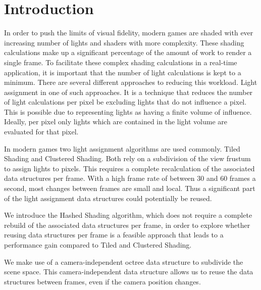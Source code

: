 \section{Introduction}

In order to push the limits of visual fidelity, modern games are shaded with
ever increasing number of lights and shaders with more complexity. These shading
calculations make up a significant percentage of the amount of work to render a
single frame. To facilitate these complex shading calculations in a real-time
application, it is important that the number of light calculations is kept to
a minimum. There are several different approaches to reducing this workload.
Light assignment in one of such approaches. It is a technique that reduces the
number of light calculations per pixel be excluding lights that do not influence
a pixel. This is possible due to representing lights as having a finite volume
of influence. Ideally, per pixel only lights which are contained in the light
volume are evaluated for that pixel.

In modern games two light assignment algorithms are used commonly. Tiled
Shading\cite{} and Clustered Shading\cite{}. Both rely on a subdivision
of the view frustum to assign lights to pixels. This requires a complete
recalculation of the associated data structures per frame. With a high frame
rate of between 30 and 60 frames a second, most changes between frames are small
and local. Thus a significant part of the light assignment data structures could
potentially be reused.

We introduce the Hashed Shading algorithm, which does not require a complete
rebuild of the associated data structures per frame, in order to explore
whether reusing data structures per frame is a feasible approach that leads
to a performance gain compared to Tiled and Clustered Shading.

We make use of a camera-independent octree data structure to subdivide the scene
space. This camera-independent data structure allows us to reuse the data structures
between frames, even if the camera position changes.

